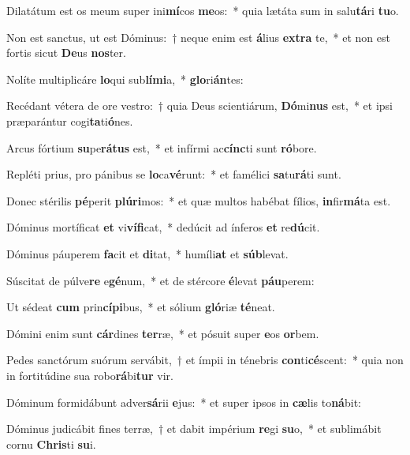\item Dilatátum est os meum super ini\textbf{mí}cos \textbf{me}os:~* quia lætáta sum in salu\textbf{tá}ri \textbf{tu}o.
\item Non est sanctus, ut est Dóminus:~† neque enim est \textbf{á}lius \textbf{ex}\textbf{tra} te,~* et non est fortis sicut \textbf{De}us \textbf{nos}ter.
\item Nolíte multiplicáre \textbf{lo}qui sub\textbf{lí}\textbf{mi}a,~* \textbf{glo}ri\textbf{án}tes:
\item Recédant vétera de ore vestro:~† quia Deus scientiárum, \textbf{Dó}mi\textbf{nus} est,~* et ipsi præparántur cogi\textbf{ta}ti\textbf{ó}nes.
\item Arcus fórtium \textbf{su}pe\textbf{rá}\textbf{tus} est,~* et infírmi ac\textbf{cínc}ti sunt \textbf{ró}bore.
\item Repléti prius, pro pánibus se \textbf{lo}ca\textbf{vé}runt:~* et famélici \textbf{sa}tu\textbf{rá}ti sunt.
\item Donec stérilis \textbf{pé}perit \textbf{plú}\textbf{ri}mos:~* et quæ multos habébat fílios, \textbf{in}fir\textbf{má}ta est.
\item Dóminus mortíficat \textbf{et} vi\textbf{ví}\textbf{fi}cat,~* dedúcit ad ínferos \textbf{et} re\textbf{dú}cit.
\item Dóminus páuperem \textbf{fa}cit et \textbf{di}tat,~* humíli\textbf{at} et \textbf{súb}levat.
\item Súscitat de púlve\textbf{re} e\textbf{gé}num,~* et de stércore \textbf{é}levat \textbf{páu}perem:
\item Ut sédeat \textbf{cum} prin\textbf{cí}\textbf{pi}bus,~* et sólium \textbf{gló}riæ \textbf{té}neat.
\item Dómini enim sunt \textbf{cár}dines \textbf{ter}ræ,~* et pósuit super \textbf{e}os \textbf{or}bem.
\item Pedes sanctórum suórum servábit,~† et ímpii in ténebris \textbf{con}ti\textbf{cé}scent:~* quia non in fortitúdine sua robo\textbf{rá}bi\textbf{tur} vir.
\item Dóminum formidábunt adver\textbf{sá}rii \textbf{e}jus:~* et super ipsos in \textbf{cæ}lis to\textbf{ná}bit:
\item Dóminus judicábit fines terræ,~† et dabit impérium \textbf{re}gi \textbf{su}o,~* et sublimábit cornu \textbf{Chris}ti \textbf{su}i.
